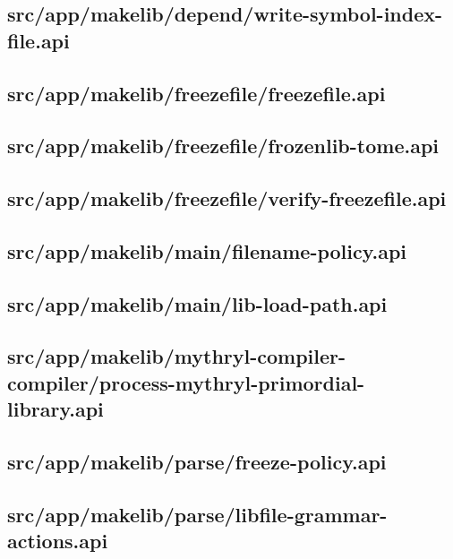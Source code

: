 \subsection{src/app/makelib/depend/write-symbol-index-file.api}


\subsection{src/app/makelib/freezefile/freezefile.api}


\subsection{src/app/makelib/freezefile/frozenlib-tome.api}


\subsection{src/app/makelib/freezefile/verify-freezefile.api}


\subsection{src/app/makelib/main/filename-policy.api}


\subsection{src/app/makelib/main/lib-load-path.api}


\subsection{src/app/makelib/mythryl-compiler-compiler/process-mythryl-primordial-library.api}


\subsection{src/app/makelib/parse/freeze-policy.api}


\subsection{src/app/makelib/parse/libfile-grammar-actions.api}


